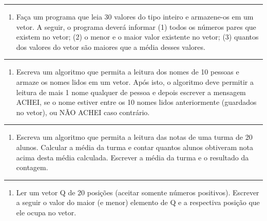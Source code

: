 \documentclass[12pt,a4paper]{article}
\providecommand{\tightlist}{%
      \setlength{\itemsep}{0pt}\setlength{\parskip}{0pt}}
\begin{document}
    \begin{center}\rule{0.5\linewidth}{0.5pt}\end{center}

\begin{enumerate}
\def\labelenumi{\arabic{enumi}.}
\setcounter{enumi}{3}
\tightlist
\item
  Faça um programa que leia 30 valores do tipo inteiro e armazene-os em
  um vetor. A seguir, o programa deverá informar (1) todos os números
  pares que existem no vetor; (2) o menor e o maior valor existente no
  vetor; (3) quantos dos valores do vetor são maiores que a média desses
  valores.
\end{enumerate}

    \begin{center}\rule{0.5\linewidth}{0.5pt}\end{center}

\begin{enumerate}
\def\labelenumi{\arabic{enumi}.}
\setcounter{enumi}{4}
\tightlist
\item
  Escreva um algoritmo que permita a leitura dos nomes de 10 pessoas e
  armaze os nomes lidos em um vetor. Após isto, o algoritmo deve
  permitir a leitura de mais 1 nome qualquer de pessoa e depois escrever
  a mensagem ACHEI, se o nome estiver entre os 10 nomes lidos
  anteriormente (guardados no vetor), ou NÃO ACHEI caso contrário.
\end{enumerate}

    \begin{center}\rule{0.5\linewidth}{0.5pt}\end{center}

\begin{enumerate}
\def\labelenumi{\arabic{enumi}.}
\setcounter{enumi}{5}
\tightlist
\item
  Escreva um algoritmo que permita a leitura das notas de uma turma de
  20 alunos. Calcular a média da turma e contar quantos alunos obtiveram
  nota acima desta média calculada. Escrever a média da turma e o
  resultado da contagem.
\end{enumerate}

    \begin{center}\rule{0.5\linewidth}{0.5pt}\end{center}

\begin{enumerate}
\def\labelenumi{\arabic{enumi}.}
\setcounter{enumi}{6}
\tightlist
\item
  Ler um vetor Q de 20 posições (aceitar somente números positivos).
  Escrever a seguir o valor do maior (e menor) elemento de Q e a
  respectiva posição que ele ocupa no vetor.
\end{enumerate}
\end{document}
